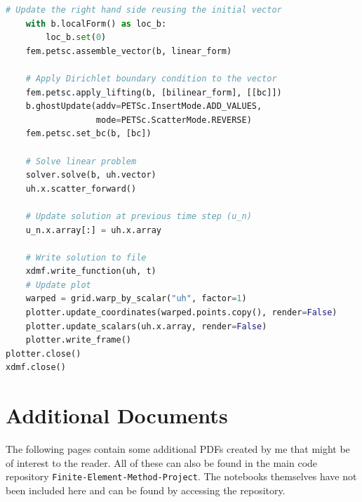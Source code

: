 \begin{appendices}
\begin{lstlisting}[language=Python, caption={The Heat Equation - Diffusion of a Gaussian Function}]
    # Update the right hand side reusing the initial vector
    with b.localForm() as loc_b:
        loc_b.set(0)
    fem.petsc.assemble_vector(b, linear_form)
    
    # Apply Dirichlet boundary condition to the vector
    fem.petsc.apply_lifting(b, [bilinear_form], [[bc]])
    b.ghostUpdate(addv=PETSc.InsertMode.ADD_VALUES, 
                  mode=PETSc.ScatterMode.REVERSE)
    fem.petsc.set_bc(b, [bc])

    # Solve linear problem
    solver.solve(b, uh.vector)
    uh.x.scatter_forward()

    # Update solution at previous time step (u_n)
    u_n.x.array[:] = uh.x.array

    # Write solution to file
    xdmf.write_function(uh, t)
    # Update plot
    warped = grid.warp_by_scalar("uh", factor=1)
    plotter.update_coordinates(warped.points.copy(), render=False)
    plotter.update_scalars(uh.x.array, render=False)
    plotter.write_frame()
plotter.close()
xdmf.close()
\end{lstlisting}

\chapter{Additional Documents}
\label{appendix:additional-pdfs}

The following pages contain some additional PDFs created by me that might be of interest to the reader. All of these can also be found in the main code repository \texttt{Finite-Element-Method-Project}. The notebooks themselves have not been included here and can be found by accessing the repository.


\end{appendices}
